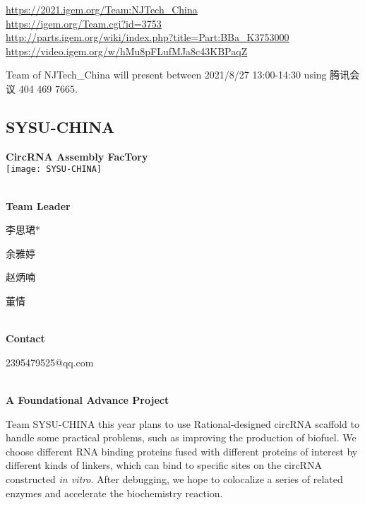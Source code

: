 \url{https://2021.igem.org/Team:NJTech\_China }\\
\url{https://igem.org/Team.cgi?id=3753 }\\
\url{http://parts.igem.org/wiki/index.php?title=Part:BBa_K3753000 }\\
\url{https://video.igem.org/w/hMu8pFLufMJa8c43KBPaqZ }\\

\vfill{}









Team of NJTech\_China will present between 2021/8/27 13:00-14:30        using 腾讯会议 404 469 7665.
\newpage


\subsection{\textcolor{Blu}{ SYSU-CHINA } }
\vspace{5mm}
\begin{center}
\large{
  \textbf{ CircRNA Assembly FacTory }\\

  \texttt{[image: SYSU-CHINA]}
}
\end{center}
\textbf{\\Team Leader}

  李思珺*

  余雅婷

  赵炳喃

  董情


\textbf{\\Contact}

  2395479525@qq.com


\textbf{\\A Foundational Advance Project\\}\begin{spacing}{1.5}

Team SYSU-CHINA this year plans to use Rational-designed circRNA scaffold to handle some practical problems, such as improving the production of biofuel. We choose different RNA binding proteins fused with different proteins of interest by different kinds of linkers, which can bind to specific sites on the circRNA constructed \textit{in vitro}. After debugging, we hope to colocalize a series of related enzymes and accelerate the biochemistry reaction.\end{spacing}
\\

